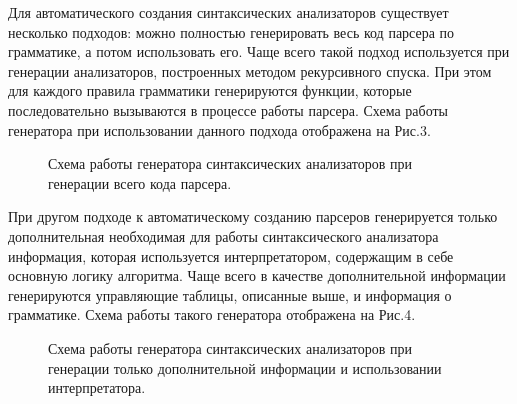 Для автоматического создания синтаксических анализаторов существует несколько подходов: можно полностью генерировать весь код парсера по грамматике, а потом использовать его. Чаще всего такой подход используется при генерации анализаторов, построенных методом рекурсивного спуска. При этом для каждого правила грамматики генерируются функции, которые последовательно вызываются в процессе работы парсера. Схема работы генератора при использовании данного подхода отображена на Рис.3.

\begin{figure}[h]
\caption{Схема работы генератора синтаксических анализаторов при генерации всего кода парсера.}
\label{fig3}
\end{figure}

При другом подходе к автоматическому созданию парсеров генерируется только дополнительная необходимая для работы синтаксического анализатора информация, которая используется интерпретатором, содержащим в себе основную логику алгоритма. Чаще всего в качестве дополнительной информации генерируются управляющие таблицы, описанные выше, и информация о грамматике. Схема работы такого генератора отображена на Рис.4.

\begin{figure}[h]
\caption{Схема работы генератора синтаксических анализаторов при генерации только дополнительной информации и использовании интерпретатора.}
\label{fig4}
\end{figure} 

